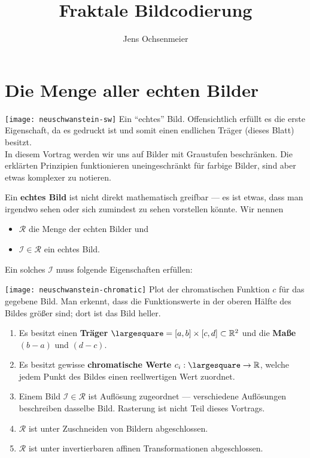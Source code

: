 \documentclass[afourpaper]{latex-classes/handout}
\title{Fraktale Bildcodierung}
\author{Jens Ochsenmeier}
\date{}
\newcommand{\marginrule}{\makebox[\linewidth]{\rule{\linewidth}{0.4pt}}}
\begin{document}
\maketitle

\section{Die Menge aller echten Bilder}

\begin{marginfigure}[8em]
  \texttt{[image: neuschwanstein-sw]}
  \footnotesize{Ein ``echtes'' Bild. Offensichtlich erfüllt es die erste Eigenschaft, da es gedruckt ist und somit einen endlichen Träger (dieses Blatt) besitzt. \\ In diesem Vortrag werden wir uns auf Bilder mit Graustufen beschränken. Die erklärten Prinzipien funktionieren uneingeschränkt für farbige Bilder, sind aber etwas komplexer zu notieren.}
  \marginrule{}
\end{marginfigure}

Ein \textbf{echtes Bild} ist nicht direkt mathematisch greifbar --- es ist etwas, dass man irgendwo sehen oder sich zumindest zu sehen vorstellen könnte. Wir nennen
\begin{itemize}
  \item \( \mathcal{R} \) die Menge der echten Bilder und
  \item \( \mathcal{I} \in \mathcal{R} \) ein echtes Bild.
\end{itemize}
Ein solches \( \mathcal{I} \) muss folgende Eigenschaften erfüllen:

\begin{marginfigure}
  \texttt{[image: neuschwanstein-chromatic]}
  \footnotesize{Plot der chromatischen Funktion \( c \) für das gegebene Bild. Man erkennt, dass die Funktionswerte in der oberen Hälfte des Bildes größer sind; dort ist das Bild heller.}
  \marginrule{}
\end{marginfigure}

\begin{enumerate}
  \item Es besitzt einen \textbf{Träger} \( \largesquare = [a,b] \times [c,d] \subset \R^2 \) und die \textbf{Maße} \( (b-a) \) und \( (d-c) \).

  \item Es besitzt gewisse \textbf{chromatische Werte} \( c_i: \largesquare \to \R \), welche jedem Punkt des Bildes einen reellwertigen Wert zuordnet.

  \item Einem Bild \( \mathcal{I} \in \mathcal{R} \) ist  Auflösung zugeordnet --- verschiedene Auflösungen beschreiben dasselbe Bild. Rasterung ist nicht Teil dieses Vortrags.

  \item \( \mathcal{R} \) ist unter Zuschneiden von Bildern abgeschlossen.
  \item \( \mathcal{R} \) ist unter invertierbaren affinen Transformationen abgeschlossen.
\end{enumerate}
\end{document}
